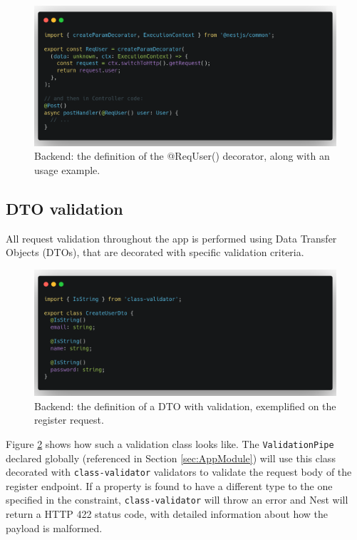 \begin{figure}[htbp]
    \centering
    \includegraphics[width=1\textwidth]{./figures/code/be_req-user.png}
    \caption{Backend: the definition of the @ReqUser() decorator, along with an usage example.}
    \label{FigBeReqUser}
\end{figure}

\subsection{DTO validation}

All request validation throughout the app is performed using Data Transfer Objects (DTOs), that are decorated with specific validation criteria.

\begin{figure}[htbp]
    \centering
    \includegraphics[width=1\textwidth]{./figures/code/be_dto.png}
    \caption{Backend: the definition of a DTO with validation, exemplified on the register request.}
    \label{FigBeDto}
\end{figure}

Figure \ref{FigBeDto} shows how such a validation class looks like. The \verb|ValidationPipe| declared globally (referenced in Section \ref{sec:AppModule}) will use this class decorated with \verb|class-validator| validators to validate the request body of the register endpoint. If a property is found to have a different type to the one specified in the constraint, \verb|class-validator| will throw an error and Nest will return a HTTP 422 status code, with detailed information about how the payload is malformed.

